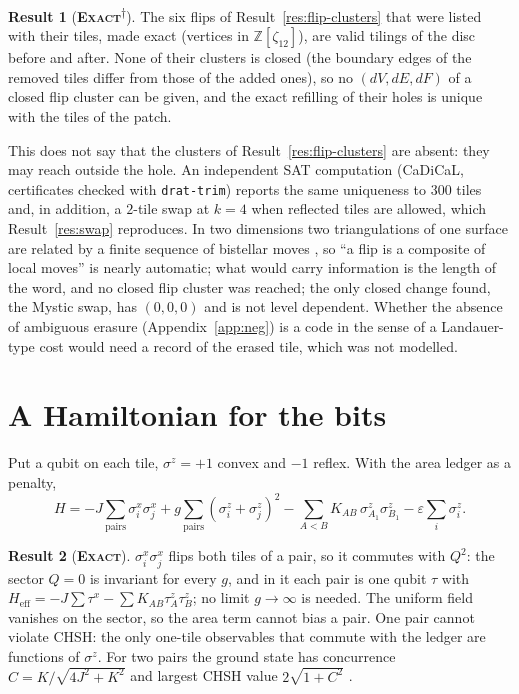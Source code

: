 \documentclass[11pt]{article}
\newcommand{\exact}{\textbf{\textsc{Exact}}}
\newcommand{\snap}{\textsuperscript{$\dagger$}}      %
\theoremstyle{definition}
\newtheorem{result}{Result}
\begin{document}
\begin{result}[\exact\snap]\label{res:flip-exact}
The six flips of Result~\ref{res:flip-clusters} that were listed with their tiles, made exact (vertices in $\mathbb{Z}[\zeta_{12}]$), are valid tilings of the disc before and after. None of their clusters is closed (the boundary edges of the removed tiles differ from those of the added ones), so no $(dV,dE,dF)$ of a closed flip cluster can be given, and the exact refilling of their holes is unique with the tiles of the patch.
\end{result}
This does not say that the clusters of Result~\ref{res:flip-clusters} are absent: they may reach outside the hole. An independent SAT computation (CaDiCaL, certificates checked with \texttt{drat-trim}) reports the same uniqueness to $300$ tiles and, in addition, a $2$-tile swap at $k=4$ when reflected tiles are allowed, which Result~\ref{res:swap} reproduces. In two dimensions two triangulations of one surface are related by a finite sequence of bistellar moves \cite{pachner1991}, so ``a flip is a composite of local moves'' is nearly automatic; what would carry information is the length of the word, and no closed flip cluster was reached; the only closed change found, the Mystic swap, has $(0,0,0)$ and is not level dependent. Whether the absence of ambiguous erasure (Appendix~\ref{app:neg}) is a code in the sense of a Landauer-type cost \cite{landauer1961} would need a record of the erased tile, which was not modelled.

\section{A Hamiltonian for the bits}\label{sec:ham}
Put a qubit on each tile, $\sigma^z=+1$ convex and $-1$ reflex. With the area ledger as a penalty,
\begin{equation}\label{eq:hbit}
H=-J\sum_{\mathrm{pairs}}\sigma^x_i\sigma^x_j+g\sum_{\mathrm{pairs}}(\sigma^z_i+\sigma^z_j)^2-\sum_{A<B}K_{AB}\,\sigma^z_{A_1}\sigma^z_{B_1}-\varepsilon\sum_i\sigma^z_i .
\end{equation}
\begin{result}[\exact]\label{res:ham-pair}
$\sigma^x_i\sigma^x_j$ flips both tiles of a pair, so it commutes with $Q^2$: the sector $Q=0$ is invariant for every $g$, and in it each pair is one qubit $\tau$ with $H_{\mathrm{eff}}=-J\sum\tau^x-\sum K_{AB}\tau^z_A\tau^z_B$; no limit $g\to\infty$ is needed. The uniform field vanishes on the sector, so the area term cannot bias a pair. One pair cannot violate CHSH: the only one-tile observables that commute with the ledger are functions of $\sigma^z$. For two pairs the ground state has concurrence $C=K/\sqrt{4J^2+K^2}$ \cite{wootters1998} and largest CHSH value $2\sqrt{1+C^2}$ \cite{horodecki1995}.
\end{result}
\end{document}
